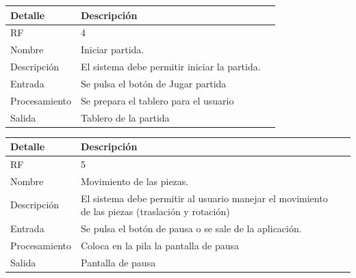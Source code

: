 \documentclass{article}
\begin{document}
\begin{table}[H]
  \begin{center}
    \begin{tabularx}{\linewidth}{|X|X|X|} %
      \hline
      \textbf{Detalle} & \textbf{Descripción}\\
      \hline
      RF & 4 \\
      \hline
      Nombre & Iniciar partida.\\
      \hline
      Descripción &  El sistema debe permitir iniciar la partida.\\
      \hline
      Entrada & Se pulsa el botón de Jugar partida\\
      \hline
      Procesamiento &  Se prepara el tablero para el usuario\\
      \hline
      Salida & Tablero de la partida\\
      \hline
    \end{tabularx}
  \end{center}
\end{table}

\begin{table}[H]
  \begin{center}
    \begin{tabularx}{\linewidth}{|X|X|X|} %
      \hline
      \textbf{Detalle} & \textbf{Descripción}\\
      \hline
      RF & 5 \\
      \hline
      Nombre & Movimiento de las piezas.\\
      \hline
      Descripción & El sistema debe permitir al usuario manejar el movimiento de las piezas (traslación y rotación)\\
      \hline
      Entrada & Se pulsa el botón de pausa o se sale de la aplicación.\\
      \hline
      Procesamiento & Coloca en la pila la pantalla de pausa\\
      \hline
      Salida & Pantalla de pausa\\
      \hline
    \end{tabularx}
  \end{center}
\end{table}
\end{document}
